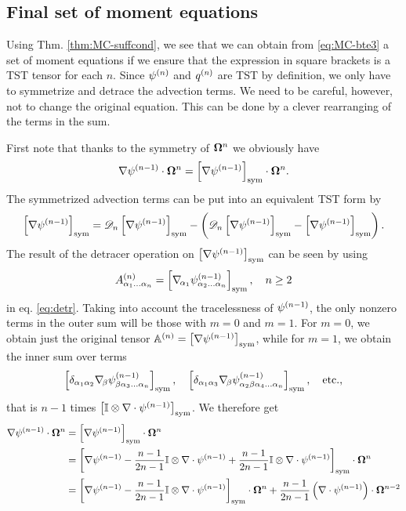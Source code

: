 \subsection{Final set of moment equations}
Using Thm. \ref{thm:MC-suffcond}, we see that we can obtain from \eqref{eq:MC-bte3} a set of moment equations if we
ensure that the expression in square brackets is a TST tensor for each $n$. Since $\fmom$ and $\qmom$ are TST by
definition, we only have to symmetrize and detrace the advection terms. We need to be careful, however, not to change
the original equation. This can be done by a clever rearranging of the terms in the sum.

First note that thanks to the symmetry of $\bomega^n$ we obviously have $$
  \nabla\fmom[n-1]\contr\bomega^n = \Sym{\nabla\fmom[n-1]}\contr\bomega^n.
$$ The symmetrized advection terms can be put into an equivalent TST form by $$
  \Sym{\nabla\fmom[n-1]} = \detr\Sym{\nabla\fmom[n-1]} - \left(\detr\Sym{\nabla\fmom[n-1]} -
  \Sym{\nabla\fmom[n-1]}\right).
$$ The result of the detracer operation on $\Sym{\nabla\fmom[n-1]}$ can be seen by using $$
  \AAA{\alpha_1\ldots\alpha_n} = \Sym{\gradcomp{\alpha_1}\fmom[n-1]_{\alpha_2\ldots\alpha_n}},\quad n \geq 2
$$ in eq. \eqref{eq:detr}. Taking into account the tracelessness of $\fmom[n-1]$, the only nonzero terms in the outer
sum will be those with $m = 0$ and $m = 1$. For $m = 0$, we obtain just the original tensor $\AA =
\Sym{\nabla\fmom[n-1]}$, while for $m = 1$, we obtain the inner sum over terms
\begin{equation*}
  \Sym{\kron{\alpha_1}{\alpha_2}\gradcomp{\beta}\fmom[n-1]_{\beta\alpha_3\ldots\alpha_n}},\quad
  \Sym{\kron{\alpha_1}{\alpha_3}\gradcomp{\beta}\fmom[n-1]_{\alpha_2\beta\alpha_4\ldots\alpha_n}},\quad\mbox{etc.},
\end{equation*}
that is $n-1$ times $\Sym{\eye\otimes\nabla\cdot\fmom[n-1]}$. We therefore get
\begin{equation}
\begin{aligned}\label{eq:MC-split0}
  \nabla\fmom[n-1]\contr\bomega^n &= \Sym{\nabla\fmom[n-1]}\contr\bomega^n\\
    & = \Sym{\nabla\fmom[n-1] - \frac{n-1}{2n-1}\eye\otimes\nabla\cdot\fmom[n-1] + \frac{n-1}{2n-1}\eye\otimes\nabla\cdot\fmom[n-1]}\contr\bomega^n\\
    & = \Sym{\nabla\fmom[n-1] - \frac{n-1}{2n-1}\eye\otimes\nabla\cdot\fmom[n-1]}\contr\bomega^n + \frac{n-1}{2n-1}\left(\nabla\cdot\fmom[n-1]\right)\contr\bomega^{n-2}
\end{aligned}
\end{equation}
